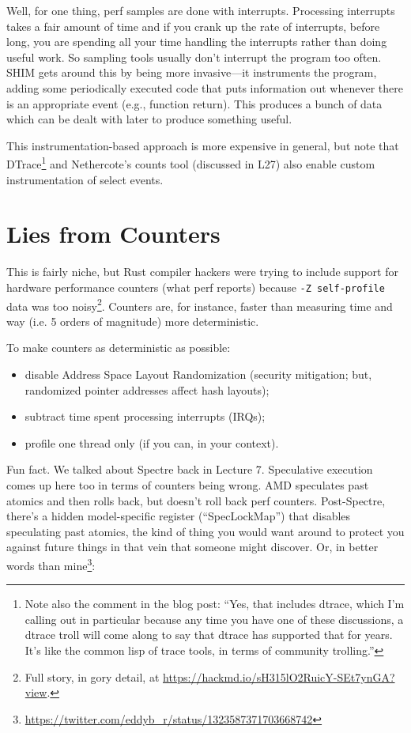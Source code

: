 Well, for one thing, perf samples are done with interrupts. Processing interrupts takes a fair amount of time and if you crank up the rate of interrupts, before long, you are spending all your time handling the interrupts rather than doing useful work. So sampling tools usually don't interrupt the program too often. SHIM gets around this by being more invasive---it instruments the program, adding some periodically executed code that puts information out whenever there is an appropriate event (e.g., function return). This produces a bunch of data which can be dealt with later to produce something useful.

This instrumentation-based approach is more expensive in general, but note that DTrace\footnote{Note also the comment in the blog post: ``Yes, that includes dtrace, which I'm calling out in particular because any time you have one of these discussions, a dtrace troll will come along to say that dtrace has supported that for years. It's like the common lisp of trace tools, in terms of community trolling.''} and Nethercote's counts tool (discussed in L27) also enable custom instrumentation of select events. 

\section*{Lies from Counters}
This is fairly niche, but Rust compiler hackers were trying to include
support for hardware performance counters (what perf reports) because
{\tt -Z self-profile} data was too noisy\footnote{Full story, in gory
detail,
at \url{https://hackmd.io/sH315lO2RuicY-SEt7ynGA?view}.}. Counters
are, for instance, faster than measuring time and way (i.e. 5 orders of magnitude) more deterministic.

To make counters as deterministic as possible:
\begin{itemize}[noitemsep]
\item disable Address Space Layout Randomization (security mitigation; but, randomized pointer addresses affect hash layouts);
\item subtract time spent processing interrupts (IRQs);
\item profile one thread only (if you can, in your context).
\end{itemize}
Fun fact. We talked about Spectre back in Lecture 7. Speculative execution comes up here too in terms of
counters being wrong. AMD speculates past atomics and then rolls back, but doesn't roll back perf counters.
Post-Spectre, there's a hidden model-specific register (``SpecLockMap'') that disables speculating past atomics, the kind of thing you would
want around to protect you against future things in that vein that someone might discover. Or, in better words than mine\footnote{\url{https://twitter.com/eddyb_r/status/1323587371703668742}}:

